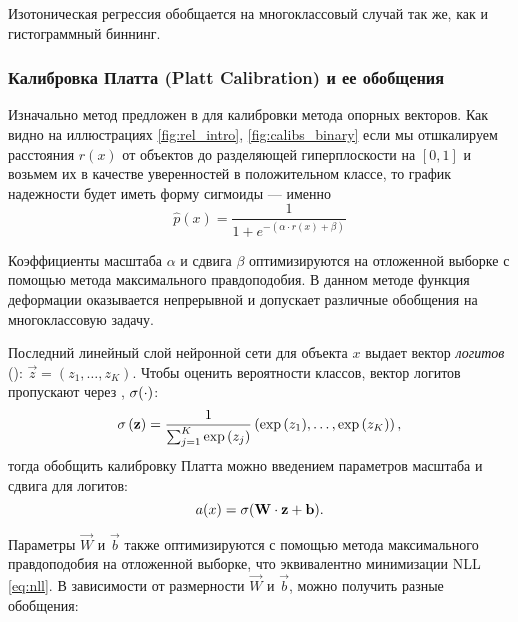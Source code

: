 \documentclass[12pt]{article}
\begin{document}
Изотоническая регрессия обобщается на многоклассовый случай так же, как и гистограммный биннинг.

\subsubsection{Калибровка Платта (Platt Calibration) и ее обобщения}
Изначально метод предложен в \cite{platt} для калибровки метода опорных векторов. Как видно на иллюстрациях \autoref{fig:rel_intro}, \autoref{fig:calibs_binary} если мы отшкалируем расстояния $r(x)$ от объектов до разделяющей гиперплоскости на $[0, 1]$ и возьмем их в качестве уверенностей в положительном классе, то график надежности будет иметь форму сигмоиды --- именно 
\begin{equation}
    \hat{p}(x) = \frac{1}{1+e^{-(\alpha \cdot r(x) + \beta)}}
\end{equation}

Коэффициенты масштаба $\alpha$ и сдвига $\beta$ оптимизируются на отложенной выборке с помощью метода максимального правдоподобия. В данном методе функция деформации оказывается непрерывной и допускает различные обобщения на многоклассовую задачу.

Последний линейный слой нейронной сети для объекта $x$ выдает вектор \emph{логитов} (): $\vec{z} = (z_1,\dots,z_K)$. Чтобы оценить вероятности классов, вектор логитов пропускают через , $\operatorname{\sigma}(\cdot)$:
\begin{equation*}
    \operatorname{\sigma}\left(\mathbf{z}\right)=
    \frac{1}{\sum_{j=1}^{K} {\exp{\left(z_j\right)}}}
    \left(
        {\exp{\left(z_1\right)}},
        \dots,
        {\exp{\left(z_K\right)}}
    \right),
\end{equation*}
тогда обобщить калибровку Платта можно введением параметров масштаба и сдвига для логитов:
\begin{equation}
    a(x) = \operatorname{\sigma}(\mathbf{W}\cdot \mathbf{z} + \mathbf{b}).
\end{equation}

Параметры $\vec{W}$ и $\vec{b}$ также оптимизируются с помощью метода максимального правдоподобия на отложенной выборке, что эквивалентно минимизации NLL \eqref{eq:nll}. В зависимости от размерности $\vec{W}$ и $\vec{b}$, можно получить разные обобщения:
\end{document}

